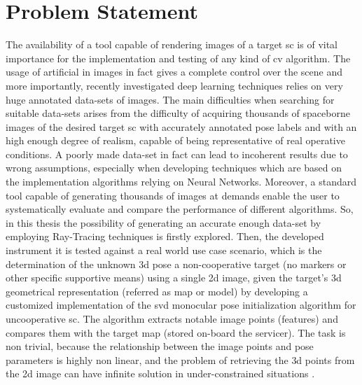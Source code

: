 \section{Problem Statement}
The availability of a tool capable of rendering images of a target  \acrshort{sc} is of vital importance for the implementation and testing of any kind of \acrshort{cv} algorithm.
The usage of artificial in images in fact gives a complete control over the scene and more importantly, recently investigated deep learning techniques relies on very huge annotated data-sets of images. The main difficulties when searching for suitable data-sets arises from the difficulty of acquiring thousands of spaceborne images of the desired target \acrshort{sc} with accurately annotated pose labels and with an high enough degree of realism, capable of being representative of real operative conditions. A poorly made data-set in fact can lead to incoherent results due to wrong assumptions, especially when developing techniques which are based on the implementation algorithms relying on Neural Networks. Moreover, a standard tool capable of generating thousands of images at demands enable the user to systematically evaluate and compare the performance of different algorithms.
So, in this thesis the possibility of generating an accurate enough data-set by employing Ray-Tracing techniques is firstly explored. Then, the developed instrument it is tested against a real world use case scenario, which is the determination of the unknown \acrshort{3d} pose a non-cooperative target (no markers or other specific supportive means) using a single \acrfull{2d} image, given the target's \acrfull{3d} geometrical representation (referred as map or model) by developing a customized implementation of the \acrshort{svd} monocular pose initialization algorithm for uncooperative \acrshort{sc}. The algorithm extracts notable image points (features) and compares them with the target map (stored on-board the servicer). The task is non trivial, because the relationship between the image points and pose parameters is highly non linear, and the problem of retrieving the \acrshort{3d} points from the \acrshort{2d} image can have infinite solution in under-constrained situations \cite{10.1145/358669.358692}.

